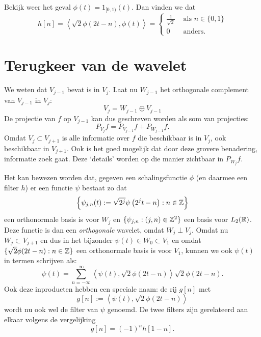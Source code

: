 \begin{voorbeeld}
  Bekijk weer het geval $\phi(t) = 1_{[0,1)}(t)$. Dan vinden we dat
    \[
    h[n] = \left\langle \sqrt{2} \phi\left(2t-n\right), \phi(t) \right\rangle = \begin{cases} \frac{1}{\sqrt{2}} & \text{ als } n \in \{0,1\} \\ 0 & \text{ anders.} \end{cases}
    \]
\end{voorbeeld}

\section{Terugkeer van de wavelet}
We weten dat $V_{j-1}$ bevat is in $V_{j}$. Laat nu $W_{j-1}$ het orthogonale complement van $V_{j-1}$ in $V_{j}$:
\begin{equation}
  \label{ruimterec}
  V_{j} = W_{j-1} \oplus V_{j-1}
\end{equation}
De projectie van $f$ op $V_{j-1}$ kan dus geschreven worden als som van projecties:
\begin{equation}
  \label{projectie_rec}
  P_{V_{j}} f = P_{V_{j-1}} f + P_{W_{j-1}} f.
\end{equation}
Omdat $V_j \subset V_{j+1}$ is alle informatie over $f$ die beschikbaar is in $V_j$, ook beschikbaar in $V_{j+1}$. Ook is het goed mogelijk dat door deze grovere benadering, informatie zoek gaat. Deze `details' worden op die manier zichtbaar in $P_{W_j} f$.

Het kan bewezen worden \cite[T7.3]{mallat} dat, gegeven een schalingsfunctie $\phi$ (en daarmee een filter $h$) er een functie $\psi$ bestaat zo dat
\[
\left\{ \psi_{j,n}(t) := \sqrt{2^j} \psi\left(2^jt - n\right) : n \in \mathbb{Z} \right\}
\] een orthonormale basis is voor $W_j$ en $\{ \psi_{j,n}: (j,n) \in \mathbb{Z}^2 \}$ een basis voor $L_2(\mathbb{R})$. Deze functie is dan een \emph{orthogonale} wavelet, omdat $W_j \perp V_j$.
Omdat nu $W_j \subset V_{j+1}$ en dus in het bijzonder $\psi(t) \in W_0 \subset V_1$ en omdat $\{ \sqrt{2}\phi(2t-n): n \in \mathbb{Z} \}$ een orthonormale basis is voor $V_1$, kunnen we ook $\psi(t)$ in termen schrijven als:
\[
\psi\left(t\right) = \sum_{n=-\infty}^{\infty} \left\langle \psi\left(t\right), \sqrt{2}\phi(2t-n) \right\rangle \sqrt{2}\phi(2t-n).
\]
Ook deze inproducten hebben een speciale naam: de rij $g[n]$ met
\[
g[n] := \left\langle \psi\left(t\right), \sqrt{2}\phi(2t-n) \right\rangle
\]
wordt nu ook wel de filter van $\psi$ genoemd. De twee filters zijn gerelateerd aan elkaar volgens de vergelijking\cite[V13]{wavelet_filter}\cite[P958]{daubechies}
\begin{equation}
\label{highpassfilter}
g[n] = (-1)^{n}h[1-n].
\end{equation}


